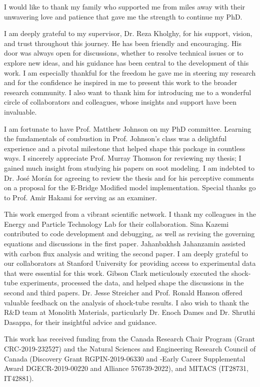 
\begin{acknowledgements}      


I would like to thank my family who supported me from miles away with  their unwavering love and patience that gave me the strength to continue my PhD.

I am deeply grateful to my supervisor, Dr. Reza Kholghy, for his support, vision, and trust throughout this journey. He has been friendly and encouraging. His door was always open for discussions, whether to resolve technical issues or to explore new ideas, and his guidance has been central to the development of this work. I am especially thankful for the freedom he gave me in steering my research and for the confidence he inspired in me to present this work to the broader research community. I also want to thank him for introducing me to a wonderful circle of collaborators and colleagues, whose insights and support have been invaluable.

I am fortunate to have Prof. Matthew Johnson on my PhD committee. Learning the fundamentals of combustion in Prof. Johnson's class was a delightful experience and a pivotal milestone that helped shape this package in countless ways. I sincerely appreciate Prof. Murray Thomson for reviewing my thesis; I gained much insight from studying his papers on soot modeling. I am indebted to Dr. José Morán for agreeing to review the thesis and for his perceptive comments on a proposal for the E-Bridge Modified model implementation. Special thanks go to Prof. Amir Hakami for serving as an examiner.

This work emerged from a vibrant scientific network. I thank my colleagues in the Energy and Particle Technology Lab for their collaboration. Sina Kazemi contributed to code development and debugging, as well as revising the governing equations and discussions in the first paper. Jahanbakhsh Jahanzamin assisted with carbon flux analysis and writing the second paper. I am deeply grateful to our collaborators at Stanford University for providing access to experimental data that were essential for this work. Gibson Clark meticulously executed the shock-tube experiments, processed the data, and helped shape the discussions in the second and third papers. Dr. Jesse Streicher and Prof. Ronald Hanson offered valuable feedback on the analysis of shock-tube results. I also wish to thank the R\&D team at Monolith Materials, particularly Dr. Enoch Dames and Dr. Shruthi Dasappa, for their insightful advice and guidance.

This work has received funding from the Canada Research Chair Program (Grant CRC-2019-232527) and the Natural Sciences and Engineering Research Council of Canada (Discovery Grant RGPIN-2019-06330 and -Early Career Supplemental Award DGECR-2019-00220  and Alliance 576739-2022), and MITACS (IT28731, IT42881).

\end{acknowledgements}

